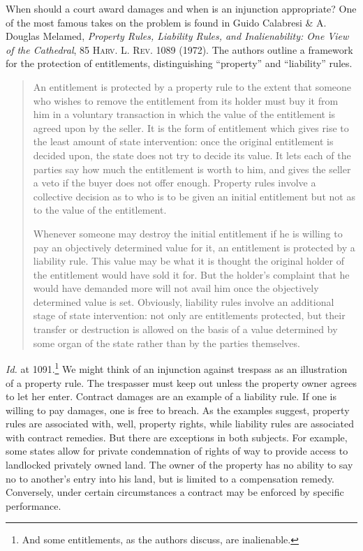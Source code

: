 
When should a court award damages and when is an injunction appropriate? One of
the most famous takes on the problem is found in Guido Calabresi \& A. Douglas
Melamed, \textit{Property Rules, Liability Rules, and Inalienability: One View
of the Cathedral}, 85 \textsc{Harv. L. Rev.} 1089 (1972). The authors outline a
framework for the protection of entitlements, distinguishing ``property'' and
``liability'' rules. 
\begin{quotation}
An entitlement is protected by a property rule to the extent that someone who
wishes to remove the entitlement from its holder must buy it from him in a
voluntary transaction in which the value of the entitlement is agreed upon by
the seller. It is the form of entitlement which gives rise to the least amount
of state intervention: once the original entitlement is decided upon, the state
does not try to decide its value. It lets each of the parties say how much the
entitlement is worth to him, and gives the seller a veto if the buyer does not
offer enough. Property rules involve a collective decision as to who is to be
given an initial entitlement but not as to the value of the entitlement.

Whenever someone may destroy the initial entitlement if he is willing to pay an
objectively determined value for it, an entitlement is protected by a liability
rule. This value may be what it is thought the original holder of the
entitlement would have sold it for. But the holder's complaint that he would
have demanded more will not avail him once the objectively determined value is
set. Obviously, liability rules involve an additional stage of state
intervention: not only are entitlements protected, but their transfer or
destruction is allowed on the basis of a value determined by some organ of the
state rather than by the parties themselves.
\end{quotation}
\textit{Id.} at 1091.\footnote{And some entitlements, as the authors discuss,
are inalienable.} We might think of an injunction against trespass as an
illustration of a property rule. The trespasser must keep out unless the
property owner agrees to let her enter. Contract damages are an example of a
liability rule. If one is willing to pay damages, one is free to breach. As the
examples suggest, property rules are associated with, well, property rights,
while liability rules are associated with contract remedies. But there are
exceptions in both subjects. For example, some states allow for private
condemnation of rights of way to provide access to landlocked privately owned
land. The owner of the property has no ability to say no to another's entry into
his land, but is limited to a compensation remedy. Conversely, under certain
circumstances a contract may be enforced by specific performance.

